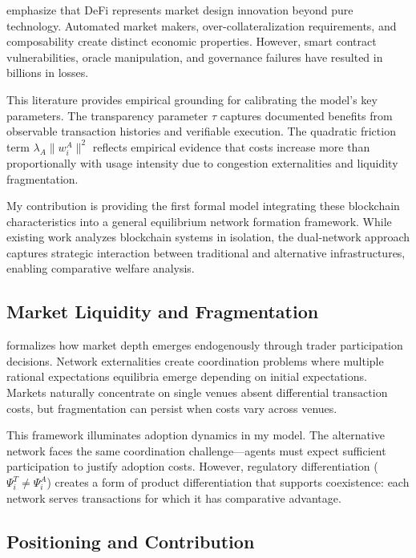 \documentclass[12pt]{article}
\begin{document}
\citet{harvey_defi_2021} emphasize that DeFi represents market design innovation beyond pure technology. Automated market makers, over-collateralization requirements, and composability create distinct economic properties. However, smart contract vulnerabilities, oracle manipulation, and governance failures have resulted in billions in losses.

This literature provides empirical grounding for calibrating the model's key parameters. The transparency parameter $\tau$ captures documented benefits from observable transaction histories and verifiable execution. The quadratic friction term $\lambda_A \|w_i^A\|^2$ reflects empirical evidence that costs increase more than proportionally with usage intensity due to congestion externalities and liquidity fragmentation.

My contribution is providing the first formal model integrating these blockchain characteristics into a general equilibrium network formation framework. While existing work analyzes blockchain systems in isolation, the dual-network approach captures strategic interaction between traditional and alternative infrastructures, enabling comparative welfare analysis.

\subsection{Market Liquidity and Fragmentation}

\citet{pagano_trading_1989} formalizes how market depth emerges endogenously through trader participation decisions. Network externalities create coordination problems where multiple rational expectations equilibria emerge depending on initial expectations. Markets naturally concentrate on single venues absent differential transaction costs, but fragmentation can persist when costs vary across venues.

This framework illuminates adoption dynamics in my model. The alternative network faces the same coordination challenge—agents must expect sufficient participation to justify adoption costs. However, regulatory differentiation ($\Psi_i^T \neq \Psi_i^A$) creates a form of product differentiation that supports coexistence: each network serves transactions for which it has comparative advantage.

\subsection{Positioning and Contribution}
\end{document}
